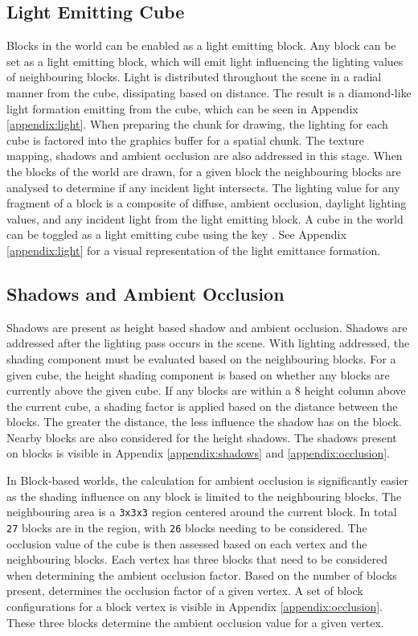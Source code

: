 \documentclass[a4paper,11pt,titlepage]{scrartcl}
\begin{document}
\subsection{Light Emitting Cube}
\label{section:lights}
Blocks in the world can be enabled as a light emitting block. Any block can be set as a light emitting block, which will emit light influencing the lighting values of neighbouring blocks. Light is distributed throughout the scene in a radial manner from the cube, dissipating based on distance. The result is a diamond-like light formation emitting from the cube, which can be seen in Appendix \ref{appendix:light}. When preparing the chunk for drawing, the lighting for each cube is factored into the graphics buffer for a spatial chunk. The texture mapping, shadows and ambient occlusion are also addressed in this stage. When the blocks of the world are drawn, for a given block the neighbouring blocks are analysed to determine if any incident light intersects. The lighting value for any fragment of a block is a composite of diffuse, ambient occlusion, daylight lighting values, and any incident light from the light emitting block. 
\vskip 2.5mm\noindent
A cube in the world can be toggled as a light emitting cube using the key . See Appendix \ref{appendix:light} for a visual representation of the light emittance formation.
    
\subsection{Shadows and Ambient Occlusion}
\label{section:shadows}
Shadows are present as height based shadow and ambient occlusion. Shadows are addressed after the lighting pass occurs in the scene. With lighting addressed, the shading component must be evaluated based on the neighbouring blocks. For a given cube, the height shading component is based on whether any blocks are currently above the given cube. If any blocks are within a $8$ height column above the current cube, a shading factor is applied based on the distance between the blocks. The greater the distance, the less influence the shadow has on the block. Nearby blocks are also considered for the height shadows. The shadows present on blocks is visible in Appendix \ref{appendix:shadows} and \ref{appendix:occlusion}.

In Block-based worlds, the calculation for ambient occlusion is significantly easier as the shading influence on any block is limited to the neighbouring blocks. The neighbouring area is a \texttt{3x3x3} region centered around the current block. In total \texttt{27} blocks are in the region, with \texttt{26} blocks needing to be considered. The occlusion value of the cube is then assessed based on each vertex and the neighbouring blocks. Each vertex has three blocks that need to be considered when determining the ambient occlusion factor. Based on the number of blocks present, determines the occlusion factor of a given vertex. A set of block configurations for a block vertex is visible in Appendix \ref{appendix:occlusion}. These three blocks determine the ambient occlusion value for a given vertex.
\end{document}
